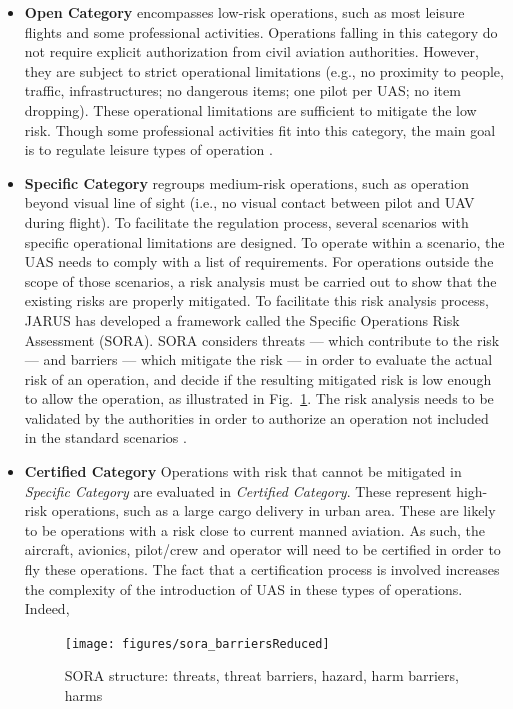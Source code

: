 \begin{itemize}
\item{\textbf{Open Category} encompasses low-risk operations, such as most leisure flights and some professional activities. 
Operations falling in this category do not require explicit authorization from civil aviation authorities. 
However, they are subject to strict operational limitations (e.g., no proximity to people, traffic, infrastructures; no dangerous items; one pilot per UAS; no item dropping). 
These operational limitations are sufficient to mitigate the low risk. 
Though some professional activities fit into this category, the main goal is to regulate leisure types of operation \cite{manfredi2018unmanned}.}
\item{\textbf{Specific Category} regroups medium-risk operations, such as operation beyond visual line of sight (i.e., no visual contact between pilot and UAV during flight). 
To facilitate the regulation process, several scenarios with specific operational limitations are designed. 
To operate within a scenario, the UAS needs to comply with a list of requirements.
For operations outside the scope of those scenarios, a risk analysis must be carried out to show that the existing risks are properly mitigated. 
To facilitate this risk analysis process, JARUS has developed a framework called the Specific Operations Risk Assessment (SORA). 
SORA considers threats --- which contribute to the risk --- and barriers --- which mitigate the risk --- in order to evaluate the actual risk of an operation, and decide if the resulting mitigated risk is low enough to allow the operation, as illustrated in Fig.~\ref{fig:sora_barriersReduced}.
The risk analysis needs to be validated by the authorities in order to authorize an operation not included in the standard scenarios \cite{manfredi2018unmanned}.}
\item{\textbf{Certified Category}  Operations with risk that cannot be mitigated in \emph{Specific Category} are evaluated in \emph{Certified Category}. 
These represent high-risk operations, such as a large cargo delivery in urban area. 
These are likely to be operations with a risk close to current manned aviation. 
As such, the aircraft, avionics, pilot/crew and operator will need to be certified in order to fly these operations. 
The fact that a certification process is involved increases the complexity of the introduction of UAS in these types of operations. 
Indeed,  
\begin{landscape}
\begin{figure}
\begin{center}
\texttt{[image: figures/sora\_barriersReduced]}    %
\caption{SORA structure: threats, threat barriers, hazard, harm barriers, harms} 
\label{fig:sora_barriersReduced}
\end{center}
\end{figure}
\end{landscape}

}
\end{itemize}
